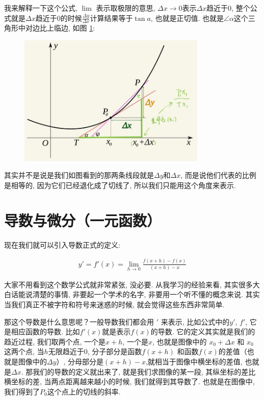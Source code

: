 我来解释一下这个公式, $\lim$ 表示取极限的意思, $\Delta x \to 0$表示$\Delta x$趋近于0,  整个公式就是$\Delta x$趋近于0的时候$\frac{\Delta y}{\Delta x}$计算结果等于$\tan a$, 也就是正切值. 也就是$\angle \alpha$这个三角形中对边比上临边, 如图 \ref{fig:img3_4}:

\begin{figure}[ht]
  \centering
  \includegraphics[width=0.8\textwidth]{asset/ac2df882-fb9f-4ddc-ae48-888ff4dec6a6.jpg}
  \caption{}
  \label{fig:img3_4}
\end{figure}

其实并不是说是我们如图看到的那两条线段就是$\Delta y$和$\Delta x$, 而是说他们代表的比例是相等的, 因为它们已经退化成了切线了, 所以我们只能用这个角度来表示. 

\section{导数与微分（一元函数）}

现在我们就可以引入导数正式的定义:

\begin{align*}
  y'=f'(x)=\lim_{h \to 0}\frac{f(x+h)-f(x)}{(x+h)-x}
\end{align*}

大家不用看到这个数学公式就非常紧张, 没必要. 从我学习的经验来看, 其实很多大白话能说清楚的事情, 非要起一个学术的名字, 非要用一个听不懂的概念来说. 其实当我们真正不被字符和符号来迷惑的时候, 就会觉得这些东西非常简单. 

那这个导数是什么意思呢？一般导数我们都会用 $'$ 来表示, 比如公式中的$y'$, $f'$, 它是相应函数的导数. 比如$f'(x)$就是表示$f(x)$的导数. 它的定义其实就是我们的趋近过程, 我们取两个点, 一个是$x+h$,  一个是$x$, 也就是图像中的 $x_0+\Delta x$ 和 $x_0$ 这两个点, 当$h$无限趋近于0, 分子部分是函数$f(x+h)$ 和函数$f(x)$的差值（也就是图像中的$\Delta y$）, 分母部分是$(x+h)-x$,就相当于图像中横坐标的差值, 也就是$\Delta x$. 那我们的导数的定义就出来了, 就是我们求图像的某一段, 其纵坐标的差比横坐标的差, 当两点距离越来越小的时候, 我们就得到其导数了. 也就是在图像中, 我们得到了$P_0$这个点上的切线的斜率. 

